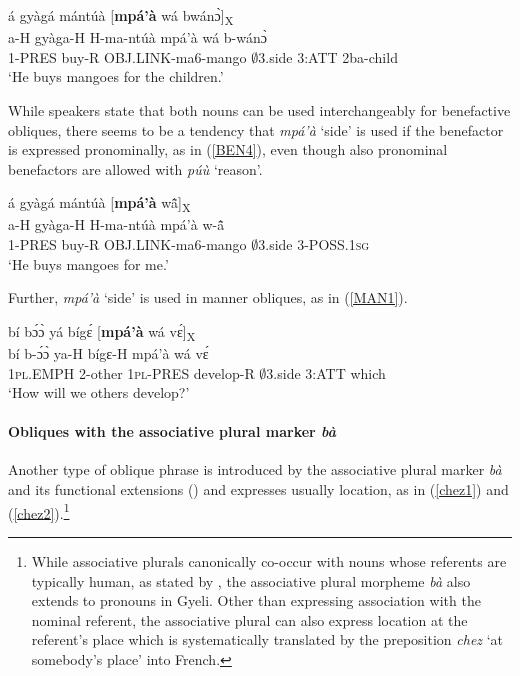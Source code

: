 \begin{exe} 
\ex\label{BEN3}
  \glll á gyàgá mántúà [{\bfseries mpá'à} wá bwánɔ̀]\textsubscript{X}\\
        a-H gyàga-H H-ma-ntúà mpá'à wá b-wánɔ̀\\
        1-PRES buy-R OBJ.LINK-ma6-mango $\emptyset$3.side 3:ATT 2ba-child\\ 
    \trans `He buys mangoes for the children.'
\end{exe}

While speakers state that both nouns can be used interchangeably for benefactive obliques, there seems to be a tendency that {\itshape mpá'à} `side' is used if the benefactor is expressed pronominally, as in (\ref{BEN4}), even though also pronominal benefactors are allowed with {\itshape púù} `reason'.

\begin{exe} 
\ex\label{BEN4}
  \glll á gyàgá mántúà [{\bfseries mpá'à} wã̂]\textsubscript{X} \\
        a-H gyàga-H H-ma-ntúà mpá'à w-ã̂ \\
        1-PRES buy-R OBJ.LINK-ma6-mango $\emptyset$3.side 3-POSS.1\textsc{sg} \\
    \trans `He buys mangoes for me.'
\end{exe}

\noindent Further, {\itshape mpá'à} `side' is used in manner obliques, as in (\ref{MAN1}).

\begin{exe} 
\ex\label{MAN1}
  \glll   bí bɔ́ɔ̀ yá bígɛ́ [{\bfseries mpá'à} wá vɛ́]\textsubscript{X} \\
           bí b-ɔ́ɔ̀ ya-H bígɛ-H mpá'à wá vɛ́ \\
           1\textsc{pl}.EMPH 2-other 1\textsc{pl}-PRES develop-R $\emptyset$3.side 3:ATT which  \\
    \trans `How will we others develop?'
\end{exe}



\paragraph{Obliques with the associative plural marker {\itshape bà}}
Another type of oblique phrase is introduced by the associative plural marker {\itshape bà} and its functional extensions () and expresses usually location, as in (\ref{chez1}) and (\ref{chez2}).\footnote{While associative plurals canonically co-occur with nouns whose referents are typically human, as stated by \citet{daniel2013}, the associative plural morpheme {\itshape bà} also extends to pronouns in Gyeli. Other than expressing association with the nominal referent, the associative plural can also express location at the referent's place which is systematically translated by the preposition {\itshape chez} `at somebody's place' into French.}

